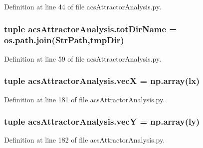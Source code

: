 Definition at line 44 of file acs\-Attractor\-Analysis.\-py.

\hypertarget{a00096_ad3caf9c42727aaab24f4ea4dae362fc9}{
\subsubsection[{tot\-Dir\-Name}]{\setlength{\rightskip}{0pt plus 5cm}tuple acs\-Attractor\-Analysis.\-tot\-Dir\-Name = os.\-path.\-join({\bf Str\-Path},tmp\-Dir)}}\label{a00096_ad3caf9c42727aaab24f4ea4dae362fc9}


Definition at line 59 of file acs\-Attractor\-Analysis.\-py.

\hypertarget{a00096_af20e9c92b7d977049b881882c0d1382c}{
\subsubsection[{vec\-X}]{\setlength{\rightskip}{0pt plus 5cm}tuple acs\-Attractor\-Analysis.\-vec\-X = np.\-array(lx)}}\label{a00096_af20e9c92b7d977049b881882c0d1382c}


Definition at line 181 of file acs\-Attractor\-Analysis.\-py.

\hypertarget{a00096_a691fb5bd87af2162b5acaf48ea4c06e7}{
\subsubsection[{vec\-Y}]{\setlength{\rightskip}{0pt plus 5cm}tuple acs\-Attractor\-Analysis.\-vec\-Y = np.\-array(ly)}}\label{a00096_a691fb5bd87af2162b5acaf48ea4c06e7}


Definition at line 182 of file acs\-Attractor\-Analysis.\-py.

